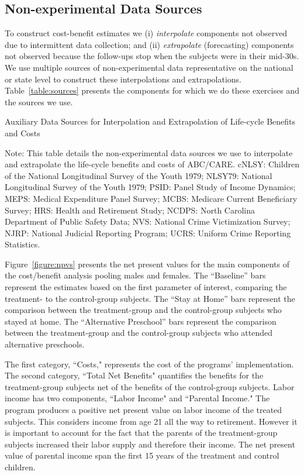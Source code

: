 \subsection{Non-experimental Data Sources}

To construct cost-benefit estimates we (i) \textit{interpolate} components not observed due to intermittent data collection; and (ii) \textit{extrapolate} (forecasting) components not observed because the follow-ups stop when the subjects were in their mid-30s. We use multiple sources of non-experimental data representative on the national or state level to construct these interpolations and extrapolations. Table~\ref{table:sources} presents the components for which we do these exercises and the sources we use.

\begin{table}[!htbp]
\begin{threeparttable}
\caption{Auxiliary Data Sources for Interpolation and Extrapolation of Life-cycle Benefits and Costs} \label{table:sources}
\footnotesize

\begin{tablenotes}
\footnotesize
Note: This table details the non-experimental data sources we use to interpolate and extrapolate the life-cycle benefits and costs of ABC/CARE. cNLSY: Children of the National Longitudinal Survey of the Youth 1979; NLSY79: National Longitudinal Survey of the Youth 1979; PSID: Panel Study of Income Dynamics; MEPS: Medical Expenditure Panel Survey; MCBS: Medicare Current Beneficiary Survey; HRS: Health and Retirement Study; NCDPS: North Carolina Department of Public Safety Data; NVS: National Crime Victimization Survey; NJRP: National Judicial Reporting Program; UCRS: Uniform Crime Reporting Statistics.
\end{tablenotes}
\end{threeparttable}
\end{table}

Figure~\ref{figure:npvs} presents the net present values for the main components of the cost/benefit analysis pooling males and females. The ``Baseline'' bars represent the estimates based on the first parameter of interest, comparing the treatment- to the control-group subjects. The ``Stay at Home'' bars represent the comparison between the treatment-group and the control-group subjects who stayed at home. The ``Alternative Preschool'' bars represent the comparison between the treatment-group and the control-group subjects who attended alternative preschools.

The first category, ``Costs," represents the cost of the programs' implementation. The second category, ``Total Net Benefits" quantifies the benefits for the treatment-group subjects net of the benefits of the control-group subjects. Labor income has two components, ``Labor Income" and ``Parental Income." The program produces a positive net present value on labor income of the treated subjects. This considers income from age 21 all the way to retirement. However it is important to account for the fact that the parents of the treatment-group subjects increased their labor supply and therefore their income. The net present value of parental income span the first 15 years of the treatment and control children.

